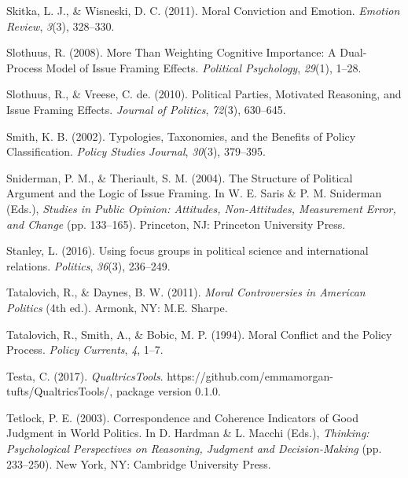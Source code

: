 \documentclass[12pt,econ]{sources/authesis}
\begin{document}
\leavevmode\hypertarget{ref-skitka_moral_2011}{}%
Skitka, L. J., \& Wisneski, D. C. (2011). Moral Conviction and Emotion. \emph{Emotion Review}, \emph{3}(3), 328--330.

\leavevmode\hypertarget{ref-slothuus_more_2008}{}%
Slothuus, R. (2008). More Than Weighting Cognitive Importance: A Dual-Process Model of Issue Framing Effects. \emph{Political Psychology}, \emph{29}(1), 1--28.

\leavevmode\hypertarget{ref-slothuus_political_2010}{}%
Slothuus, R., \& Vreese, C. de. (2010). Political Parties, Motivated Reasoning, and Issue Framing Effects. \emph{Journal of Politics}, \emph{72}(3), 630--645.

\leavevmode\hypertarget{ref-smith_typologies_2002}{}%
Smith, K. B. (2002). Typologies, Taxonomies, and the Benefits of Policy Classification. \emph{Policy Studies Journal}, \emph{30}(3), 379--395.

\leavevmode\hypertarget{ref-sniderman_structure_2004}{}%
Sniderman, P. M., \& Theriault, S. M. (2004). The Structure of Political Argument and the Logic of Issue Framing. In W. E. Saris \& P. M. Sniderman (Eds.), \emph{Studies in Public Opinion: Attitudes, Non-Attitudes, Measurement Error, and Change} (pp. 133--165). Princeton, NJ: Princeton University Press.

\leavevmode\hypertarget{ref-stanley_2016_using}{}%
Stanley, L. (2016). Using focus groups in political science and international relations. \emph{Politics}, \emph{36}(3), 236--249.

\leavevmode\hypertarget{ref-tatalovich_moral_2011}{}%
Tatalovich, R., \& Daynes, B. W. (2011). \emph{Moral Controversies in American Politics} (4th ed.). Armonk, NY: M.E. Sharpe.

\leavevmode\hypertarget{ref-tatalovich_moral_1994}{}%
Tatalovich, R., Smith, A., \& Bobic, M. P. (1994). Moral Conflict and the Policy Process. \emph{Policy Currents}, \emph{4}, 1--7.

\leavevmode\hypertarget{ref-testa_2017_qualtricstools}{}%
Testa, C. (2017). \emph{QualtricsTools}. https://github.com/emmamorgan-tufts/QualtricsTools/, package version 0.1.0.

\leavevmode\hypertarget{ref-tetlock_correspondence_2003}{}%
Tetlock, P. E. (2003). Correspondence and Coherence Indicators of Good Judgment in World Politics. In D. Hardman \& L. Macchi (Eds.), \emph{Thinking: Psychological Perspectives on Reasoning, Judgment and Decision-Making} (pp. 233--250). New York, NY: Cambridge University Press.
\end{document}
